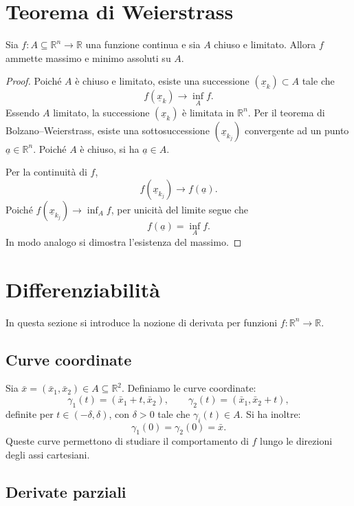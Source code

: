 \documentclass[a4paper,12pt,openright]{book}
\begin{document}
	\section{Teorema di Weierstrass}
	Sia $f : A \subseteq \mathbb{R}^n \to \mathbb{R}$ una funzione continua
	e sia $A$ chiuso e limitato.
	Allora $f$ ammette massimo e minimo assoluti su $A$.
		
	\begin{proof}
		Poiché $A$ è chiuso e limitato, esiste una successione
		$(\underline{x}_k) \subset A$ tale che
		\[
		f(\underline{x}_k) \longrightarrow \inf_A f.
		\]
		Essendo $A$ limitato, la successione $(\underline{x}_k)$ è limitata in
		$\mathbb{R}^n$.
		Per il teorema di Bolzano--Weierstrass, esiste una sottosuccessione
		$(\underline{x}_{k_j})$ convergente ad un punto $\underline{a} \in \mathbb{R}^n$.
		Poiché $A$ è chiuso, si ha $\underline{a} \in A$.
		
		Per la continuità di $f$,
		\[
		f(\underline{x}_{k_j}) \longrightarrow f(\underline{a}).
		\]
		Poiché $f(\underline{x}_{k_j}) \to \inf_A f$, per unicità del limite segue che
		\[
		f(\underline{a}) = \inf_A f.
		\]
		In modo analogo si dimostra l’esistenza del massimo.
	\end{proof}
	
	\newpage
	
    \section{Differenziabilità}
    
    In questa sezione si introduce la nozione di derivata per funzioni
    $f : \mathbb{R}^n \to \mathbb{R}$.
    
    \subsection{Curve coordinate}
    
    Sia $\bar{x} = (\bar{x}_1, \bar{x}_2) \in A \subseteq \mathbb{R}^2$.
    Definiamo le curve coordinate:
    \[
    \gamma_1(t) = (\bar{x}_1 + t, \bar{x}_2), \qquad
    \gamma_2(t) = (\bar{x}_1, \bar{x}_2 + t),
    \]
    definite per $t \in (-\delta, \delta)$, con $\delta > 0$ tale che
    $\gamma_i(t) \in A$.
    Si ha inoltre:
    \[
    \gamma_1(0) = \gamma_2(0) = \bar{x}.
    \]
    Queste curve permettono di studiare il comportamento di $f$
    lungo le direzioni degli assi cartesiani.
    
    \subsection{Derivate parziali}
    
\end{document}
